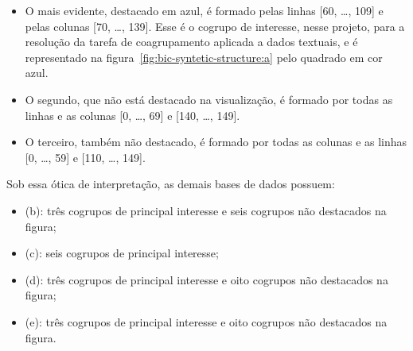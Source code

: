 \documentclass[
    12pt,                %
    oneside,            %
    a4paper,            %
    english,            %
    brazil                %
    ]{abntex2ppgsi}
\begin{document}

\begin{itemize}
\item O mais evidente, destacado em azul, é formado pelas linhas [60, \dots, 109] e pelas colunas [70, \dots, 139]. Esse é o cogrupo de interesse, nesse projeto, para a resolução da tarefa de coagrupamento aplicada a dados textuais, e é representado na figura~\ref{fig:bic-syntetic-structure:a} pelo quadrado em cor azul.
\item O segundo, que não está destacado na visualização, é formado por todas as linhas e as colunas [0, \dots, 69] e [140, \dots, 149].
\item O terceiro, também não destacado, é formado por todas as colunas e as linhas [0, \dots, 59] e [110, \dots, 149].
\end{itemize}

Sob essa ótica de interpretação, as demais bases de dados possuem:

\begin{itemize}
\item (b): três cogrupos de principal interesse e seis cogrupos não destacados na figura;
\item (c): seis cogrupos de principal interesse;
\item (d): três cogrupos de principal interesse e oito cogrupos não destacados na figura;
\item (e): três cogrupos de principal interesse e oito cogrupos não destacados na figura.
\end{itemize}



\end{document}
